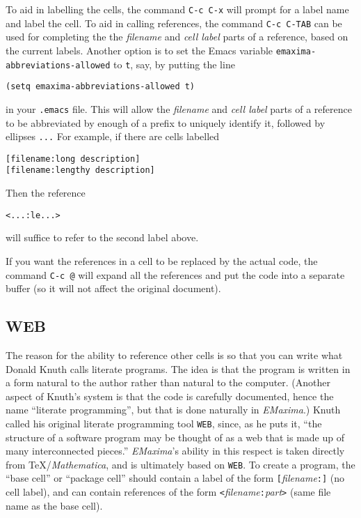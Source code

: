 \documentclass{article}
\newcommand{\emx}{\textsl{\sffamily EMaxima}}
\newcommand{\hyph}{-\hspace{0pt}}
\begin{document}
To aid in labelling the cells, the command \texttt{C-c C-x}
will prompt for a label name and label the
cell.  To aid in calling references, the command \texttt{C-c C-TAB}
can be used for completing the
the \textsl{filename} and \textsl{cell label} parts of a reference, 
based on the current labels.  
Another option is to set the Emacs variable
\texttt{emaxima\hyph{}abbreviations\hyph{}allowed} to \texttt{t}, say, by putting
the line
\begin{verbatim}
(setq emaxima-abbreviations-allowed t)
\end{verbatim}
\noindent
in your \texttt{.emacs} file.  This will allow the \textsl{filename}
and \textsl{cell label} parts of a reference to be abbreviated by enough
of a prefix to uniquely identify it, followed by ellipses
\texttt{...}
For example, if there are cells labelled
\begin{verbatim}
[filename:long description]
[filename:lengthy description]
\end{verbatim}
\noindent
Then the reference
\begin{verbatim}
<...:le...>
\end{verbatim}
\noindent
will suffice to refer to the second label above.

If you want the references in a cell to be replaced by the actual
code, the command \texttt{C-c @} will expand all the
references and put the code into a separate buffer (so it will not
affect the original document).

\subsection{WEB}

\noindent
The reason for the ability to reference other cells is so that you can
write what Donald Knuth calls literate programs.  The idea is that the
program is written in a form natural to the author rather than natural
to the computer.  (Another aspect of Knuth's system is that the code
is carefully documented, hence the name ``literate programming'', but
that is done naturally in \emx{}.)  Knuth called his original
literate programming tool \texttt{WEB}, since, as he puts it,
``the structure of a software program may be thought of as a web that
is made up of many interconnected pieces.''  
\emx{}'s ability in this respect is taken directly from
\TeX{}/\textit{Mathematica}, and is ultimately based on
\texttt{WEB}. To create a 
program, the ``base cell'' or ``package cell'' should contain 
a label of the form \texttt{[}\textsl{filename}\texttt{:]} 
(no cell label), and can
contain references of the form 
\texttt{<}\textsl{filename}\texttt{:}\textsl{part}\texttt{>}
(same file name as the base cell).  
\end{document}
